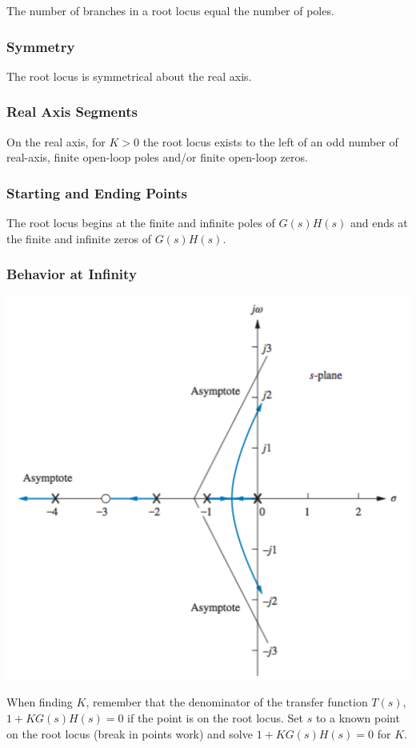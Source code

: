 \documentclass[11pt]{article}
\begin{document}
    The number of branches in a root locus equal the number of poles.

    \subsubsection{Symmetry}

    The root locus is symmetrical about the real axis.

    \subsubsection{Real Axis Segments}

    On the real axis, for $K > 0$ the root locus exists to the left of an odd number of real-axis, finite open-loop poles and/or finite open-loop zeros.

    \subsubsection{Starting and Ending Points}

    The root locus begins at the finite and infinite poles of $G(s)H(s)$ and ends at the finite and infinite zeros of $G(s)H(s)$.

    \subsubsection{Behavior at Infinity}

    \begin{center}
    \includegraphics[width=300 px]{img/asymptotes} \\
    \end{center}

    When finding $K$, remember that the denominator of the transfer function $T(s)$, $1 + KG(s)H(s) = 0$ if the point is on the root locus. Set $s$ to a known point on the root locus (break in points work) and solve $1 + KG(s)H(s) = 0$ for $K$.
\end{document}

